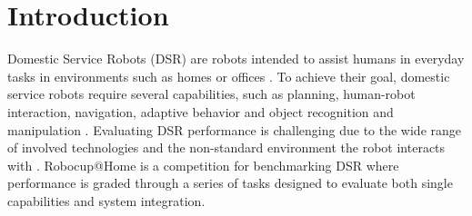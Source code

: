 \documentclass[conference,letterpaper]{ieeeconf}
\begin{document}


\section{Introduction}
\thispagestyle{mypagestyle}
Domestic Service Robots (DSR) are robots intended to assist humans in everyday tasks in environments such as homes or offices \cite{engelberger_robotics_1989}. To achieve their goal, domestic service robots require several capabilities, such as planning, human-robot interaction, navigation, adaptive behavior and object recognition and manipulation \cite{hutchison_robocuphome_2010}. Evaluating DSR performance is challenging due to the wide range of involved technologies and the non-standard environment the robot interacts with \cite{wisspeintner_robocuphome_2009}. Robocup@Home is a competition for benchmarking DSR where performance is graded through a series of tasks designed to evaluate both single capabilities and system integration. 
\end{document}
